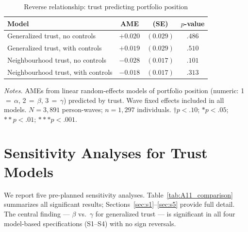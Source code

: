 \documentclass[12pt, a4paper]{article}
\newcommand{\tablenote}[1]{\vspace{4pt}\par\footnotesize\textit{Notes.} #1}
\begin{document}
\begin{table}[H]
\centering
\caption{Reverse relationship: trust predicting portfolio position}
\label{tab:A10_reverse}
\small
\begin{tabular}{lccc}
\hline\hline
  Model & AME & (SE) & $p$-value \\
\hline
  Generalized trust, no controls         & $+0.020$ & $(0.029)$ & $.486$ \\
  Generalized trust, with controls       & $+0.019$ & $(0.029)$ & $.510$ \\
  Neighbourhood trust, no controls       & $-0.028$ & $(0.017)$ & $.101$ \\
  Neighbourhood trust, with controls     & $-0.018$ & $(0.017)$ & $.313$ \\
\hline\hline
\end{tabular}
\tablenote{AMEs from linear random-effects models of portfolio position
(numeric: 1\,$=$\,$\alpha$, 2\,$=$\,$\beta$, 3\,$=$\,$\gamma$) predicted by
trust. Wave fixed effects included in all models.
$N = 3{,}891$ person-waves; $n = 1{,}297$ individuals.
$\dagger p<.10$; $* p<.05$; $** p<.01$; $*** p<.001$.}
\end{table}

\section{Sensitivity Analyses for Trust Models}
\label{sec:sensitivity}

We report five pre-planned sensitivity analyses. Table~\ref{tab:A11_comparison}
summarizes all significant results; Sections~\ref{sec:s1}--\ref{sec:s5}
provide full detail. The central finding --- $\beta$ vs.\ $\gamma$ for
generalized trust --- is significant in all four model-based specifications
(S1--S4) with no sign reversals.
\end{document}
